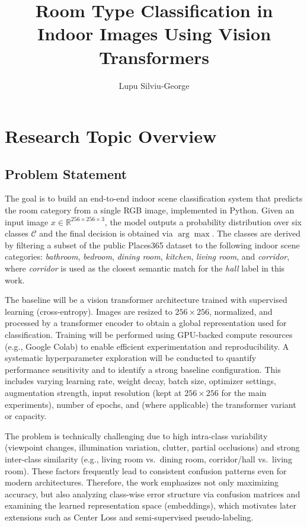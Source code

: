 \documentclass[english]{teza-upb_en}
\author{Lupu Silviu-George}
\title{Room Type Classification in Indoor Images Using Vision Transformers}
\begin{document}
\beforepreface
\tableofcontents
\afterpreface

\chapter{Research Topic Overview}

\section{Problem Statement}
The goal is to build an end-to-end indoor scene classification system that predicts the room category from a single RGB image, implemented in Python. Given an input image \(x \in \mathbb{R}^{256 \times 256 \times 3}\), the model outputs a probability distribution over six classes \(\mathcal{C}\) and the final decision is obtained via \(\arg\max\). The classes are derived by filtering a subset of the public Places365 dataset to the following indoor scene categories: \emph{bathroom}, \emph{bedroom}, \emph{dining room}, \emph{kitchen}, \emph{living room}, and \emph{corridor}, where \emph{corridor} is used as the closest semantic match for the \emph{hall} label in this work.

The baseline will be a vision transformer architecture trained with supervised learning (cross-entropy). Images are resized to \(256 \times 256\), normalized, and processed by a transformer encoder to obtain a global representation used for classification. Training will be performed using GPU-backed compute resources (e.g., Google Colab) to enable efficient experimentation and reproducibility. A systematic hyperparameter exploration will be conducted to quantify performance sensitivity and to identify a strong baseline configuration. This includes varying learning rate, weight decay, batch size, optimizer settings, augmentation strength, input resolution (kept at \(256 \times 256\) for the main experiments), number of epochs, and (where applicable) the transformer variant or capacity.

The problem is technically challenging due to high intra-class variability (viewpoint changes, illumination variation, clutter, partial occlusions) and strong inter-class similarity (e.g., living room vs.\ dining room, corridor/hall vs.\ living room). These factors frequently lead to consistent confusion patterns even for modern architectures. Therefore, the work emphasizes not only maximizing accuracy, but also analyzing class-wise error structure via confusion matrices and examining the learned representation space (embeddings), which motivates later extensions such as Center Loss and semi-supervised pseudo-labeling.
\end{document}
